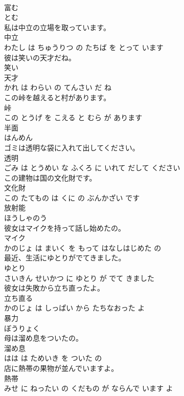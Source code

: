 \documentclass[8pt]{extreport}
\begin{document}
\begin{CJK}{UTF8}{min}
\\	富む	
\\	とむ			
\\	私は中立の立場を取っています。	
\\	中立 
\\	わたし は ちゅうりつ の たちば を とって います			
\\	彼は笑いの天才だね。	
\\	笑い 
\\	天才 
\\	かれ は わらい の てんさい だ ね			
\\	この峠を越えると村があります。	
\\	峠 
\\	この とうげ を こえる と むら が あります			
\\	半面	
\\	はんめん			
\\	ゴミは透明な袋に入れて出してください。	
\\	透明 
\\	ごみ は とうめい な ふくろ に いれて だして ください			
\\	この建物は国の文化財です。	
\\	文化財 
\\	この たてもの は くに の ぶんかざい です			
\\	放射能	
\\	ほうしゃのう			
\\	彼女はマイクを持って話し始めたの。	
\\	マイク 
\\	かのじょ は まいく を もって はなしはじめた の			
\\	最近、生活にゆとりがでてきました。	
\\	ゆとり 
\\	さいきん せいかつ に ゆとり が でて きました			
\\	彼女は失敗から立ち直ったよ。	
\\	立ち直る 
\\	かのじょ は しっぱい から たちなおった よ			
\\	暴力	
\\	ぼうりょく			
\\	母は溜め息をついたの。	
\\	溜め息 
\\	はは は ためいき を ついた の			
\\	店に熱帯の果物が並んでいますよ。	
\\	熱帯 
\\	みせ に ねったい の くだもの が ならんで います よ			

\end{CJK}
\end{document}
